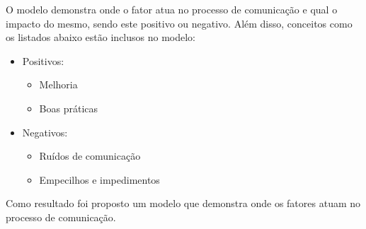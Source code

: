 


O modelo demonstra onde o fator atua no processo de comunicação e qual o impacto do mesmo, sendo este positivo ou negativo. Além disso, conceitos como os listados abaixo estão inclusos no modelo:

\begin{itemize} 
 \item Positivos: 
    \begin{itemize} 
        \item Melhoria 
        \item Boas práticas
    \end{itemize}

 \item Negativos: 
    \begin{itemize}
        \item Ruídos de comunicação
        \item Empecilhos e impedimentos 
    \end{itemize}
\end{itemize}

Como resultado foi proposto um modelo que demonstra onde os fatores atuam no processo de comunicação.

